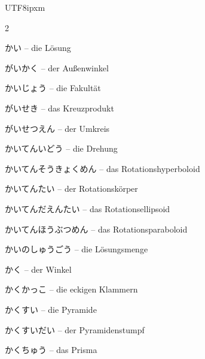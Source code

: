 \begin{CJK}{UTF8}{ipxm}
\begin{multicols}{2}
\par\nopagebreak
{} {\footnotesize\color{black!70}かい} -- die Lösung\dotfill\hyperref[e:78]{\pageref*{e:78}}\par
{} {\footnotesize\color{black!70}がいかく} -- der Außenwinkel\dotfill\hyperref[e:179]{\pageref*{e:179}}\par
{} {\footnotesize\color{black!70}かいじょう} -- die Fakultät\dotfill\hyperref[e:340]{\pageref*{e:340}}\par
{} {\footnotesize\color{black!70}がいせき} -- das Kreuzprodukt\dotfill\hyperref[e:307]{\pageref*{e:307}}\par
{} {\footnotesize\color{black!70}がいせつえん} -- der Umkreis\dotfill\hyperref[e:194]{\pageref*{e:194}}\par
{} {\footnotesize\color{black!70}かいてんいどう} -- die Drehung\dotfill\hyperref[e:174]{\pageref*{e:174}}\par
{} {\footnotesize\color{black!70}かいてんそうきょくめん} -- das Rotationshyperboloid\dotfill\hyperref[e:244]{\pageref*{e:244}}\par
{} {\footnotesize\color{black!70}かいてんたい} -- der Rotationskörper\dotfill\hyperref[e:239]{\pageref*{e:239}}\par
{} {\footnotesize\color{black!70}かいてんだえんたい} -- das Rotationsellipsoid\dotfill\hyperref[e:242]{\pageref*{e:242}}\par
{} {\footnotesize\color{black!70}かいてんほうぶつめん} -- das Rotationsparaboloid\dotfill\hyperref[e:243]{\pageref*{e:243}}\par
{} {\footnotesize\color{black!70}かいのしゅうごう} -- die Lösungsmenge\dotfill\hyperref[e:79]{\pageref*{e:79}}\par
{} {\footnotesize\color{black!70}かく} -- der Winkel\dotfill\hyperref[e:153]{\pageref*{e:153}}\par
{} {\footnotesize\color{black!70}かくかっこ} -- die eckigen Klammern\dotfill\hyperref[e:89]{\pageref*{e:89}}\par
{} {\footnotesize\color{black!70}かくすい} -- die Pyramide\dotfill\hyperref[e:230]{\pageref*{e:230}}\par
{} {\footnotesize\color{black!70}かくすいだい} -- der Pyramidenstumpf\dotfill\hyperref[e:235]{\pageref*{e:235}}\par
{} {\footnotesize\color{black!70}かくちゅう} -- das Prisma\dotfill\hyperref[e:228]{\pageref*{e:228}}\par

\end{multicols}
\end{CJK}
